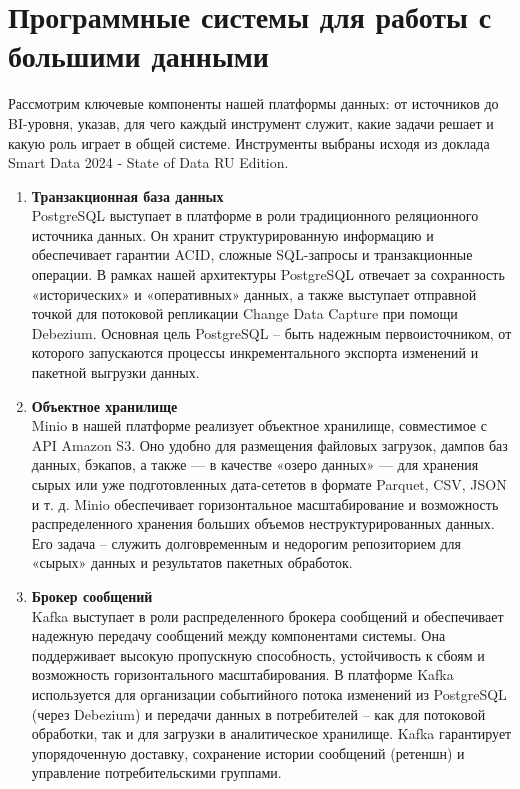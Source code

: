 \section{Программные системы для работы с большими данными} \label{ch2:system_description}
Рассмотрим ключевые компоненты нашей платформы данных: от источников до BI-уровня, указав, для чего каждый инструмент служит, какие задачи решает и какую роль играет в общей системе. Инструменты выбраны исходя из доклада Smart Data 2024 - State of Data RU Edition\cite{smartdata_2024}.
\begin{enumerate}[1.]
	\item \textbf{Транзакционная база данных}\\
	      PostgreSQL выступает в платформе в роли традиционного реляционного источника данных\cite{postgresql}. Он хранит структурированную информацию и обеспечивает гарантии ACID\cite{acid}, сложные SQL-запросы и транзакционные операции. В рамках нашей архитектуры PostgreSQL отвечает за сохранность «исторических» и «оперативных» данных, а также выступает отправной точкой для потоковой репликации Change Data Capture\cite{cdc} при помощи Debezium\cite{debezium}. Основная цель PostgreSQL – быть надежным первоисточником, от которого запускаются процессы инкрементального экспорта изменений и пакетной выгрузки данных.
	\item \textbf{Объектное хранилище}\\
	      Minio в нашей платформе реализует объектное хранилище, совместимое с API Amazon S3\cite{s3}. Оно удобно для размещения файловых загрузок, дампов баз данных, бэкапов, а также — в качестве «озеро данных»\cite{data_lake} — для хранения сырых или уже подготовленных дата-сететов в формате Parquet, CSV, JSON и т. д. Minio обеспечивает горизонтальное масштабирование и возможность распределенного хранения больших объемов неструктурированных данных. Его задача – служить долговременным и недорогим репозиторием для «сырых» данных и результатов пакетных обработок.
	\item \textbf{Брокер сообщений}\\
	      Kafka выступает в роли распределенного брокера сообщений и обеспечивает надежную передачу сообщений между компонентами системы\cite{kafka}. Она поддерживает высокую пропускную способность, устойчивость к сбоям и возможность горизонтального масштабирования. В платформе Kafka используется для организации событийного потока изменений из PostgreSQL (через Debezium) и передачи данных в потребителей – как для потоковой обработки, так и для загрузки в аналитическое хранилище. Kafka гарантирует упорядоченную доставку, сохранение истории сообщений (ретеншн) и управление потребительскими группами.

\end{enumerate}
